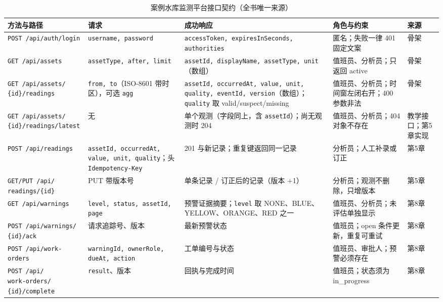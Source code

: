 \begin{table}[htbp]
\centering
\scriptsize
\setlength{\tabcolsep}{3pt}
\caption{案例水库监测平台接口契约（全书唯一来源）}
\label{tab:api-contract}
\begin{tabular}{p{3.1cm}p{2.5cm}p{3.5cm}p{2.8cm}p{1.7cm}}
\toprule
方法与路径 & 请求 & 成功响应 & 角色与约束 & 来源 \\
\midrule
\texttt{POST /api/auth/login} & \texttt{username, password} & \texttt{accessToken, expiresInSeconds, authorities} & 匿名；失败一律 401 固定文案 & 骨架 \\
\texttt{GET /api/assets} & \texttt{assetType, after, limit} & \texttt{assetId, displayName, assetType, unit}（数组） & 值班员、分析员；只返回 active & 骨架 \\
\shortstack[l]{\texttt{GET /api/assets/}\\ \texttt{\{id\}/readings}} & \texttt{from, to}（ISO-8601 带时区），可选 \texttt{agg} & \texttt{assetId, occurredAt, value, unit, quality, eventId, version}（数组）；\texttt{quality} 取 valid/suspect/missing & 值班员、分析员；时间窗左闭右开；400 参数非法 & 骨架 \\
\shortstack[l]{\texttt{GET /api/assets/}\\ \texttt{\{id\}/readings/latest}} & 无 & 单个观测（字段同上，含 \texttt{assetId}）；尚无观测时 204 & 值班员、分析员；404 对象不存在 & 教学接口；第5章实现 \\
\texttt{POST /api/readings} & \texttt{assetId, occurredAt, value, unit, quality}；头 \texttt{Idempotency-Key} & 201 与新记录；重复键返回同一记录 & 分析员；人工补录或订正 & 第5章 \\
\shortstack[l]{\texttt{GET/PUT /api/}\\ \texttt{readings/\{id\}}} & PUT 带版本号 & 单条记录 / 订正后的记录（版本 +1） & 分析员；观测不删除，只增版本 & 第5章 \\
\texttt{GET /api/warnings} & \texttt{level, status, assetId, page} & 预警证据摘要；\texttt{level} 取 NONE、BLUE、YELLOW、ORANGE、RED 之一 & 值班员、分析员；未评估单独显示 & 第8章 \\
\shortstack[l]{\texttt{POST /api/warnings/}\\ \texttt{\{id\}/ack}} & 请求追踪号、版本 & 最新预警状态 & 值班员；open 条件更新，重复可重试 & 第8章 \\
\texttt{POST /api/work-orders} & \texttt{warningId, ownerRole,} \texttt{dueAt, action} & 工单编号与状态 & 值班员、审批人；预警必须存在 & 第8章 \\
\shortstack[l]{\texttt{POST /api/}\\ \texttt{work-orders/}\\ \texttt{\{id\}/complete}} & \texttt{result}、版本 & 回执与完成时间 & 值班员；状态须为 in\_progress & 第8章 \\

\end{tabular}
\end{table}
